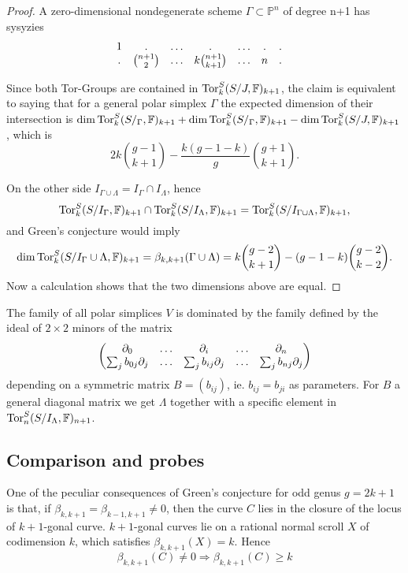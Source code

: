 \documentclass[12pt,leqno]{amsart}
\newcommand{\FF}{{\mathbb F}}
\newcommand{\PP}{{\mathbb P}}
\newcommand{\Tor}{{\rm{Tor}}}
\newlength{\ho}
\begin{document}
\begin{proof}
A zero-dimensional nondegenerate scheme $\Gamma\subset\PP^n$ of degree n+1 
has sysyzies
$$
\begin{matrix}
1 & . &\ldots& . & \ldots &.&.\cr
. &\binom{n+1}{2} &\ldots & k\binom{n+1}{k+1}
&\ldots &n&.&
\end{matrix}
$$

Since both Tor-Groups are contained in $\Tor^S_k(S/J,\FF)_{k+1}$, 
the claim is equivalent to saying that for a general polar simplex $\Gamma$ 
the expected dimension of their intersection is 
$\dim\Tor^S_k(S/_\Gamma,\FF)_{k+1}+\dim\Tor^S_k(S/_\Gamma,\FF)_{k+1}
-\dim\Tor^S_k(S/J,\FF)_{k+1}$, which is
$$
2k\binom{g-1}{k+1}-\frac{k(g-1-k)}{g}\binom{g+1}{k+1}.
$$

On the other side $I_{\Gamma\cup\Lambda}=I_\Gamma\cap I_\Lambda$, hence
$$\Tor^S_k(S/I_\Gamma,\FF)_{k+1} \cap \Tor^S_k(S/I_\Lambda,\FF)_{k+1} 
=\Tor^S_k(S/I_{\Gamma\cup\Lambda},\FF)_{k+1},$$
and Green's conjecture would imply
$$
\dim\Tor^S_k(S/I_\Gamma\cup\Lambda,\FF)_{k+1}=\beta_{k,k+1}(\Gamma\cup\Lambda)
=k\binom{g-2}{k+1}-(g-1-k)\binom{g-2}{k-2}.
$$
Now a calculation shows that the two dimensions above are equal.
\end{proof}


The family of all polar simplices $V$ is dominated by the family defined  
by the ideal of $2 \times 2$ minors of the matrix
$$\begin{pmatrix} 
\partial_0 & \ldots & \partial_i & \ldots &\partial_n \cr
\sum_j b_{0j} \partial_j & \ldots &\sum_j b_{ij} \partial_j & \ldots & \sum_j b_{nj} \partial_j
\end{pmatrix}$$
depending on     
a symmetric matrix $B=(b_{ij})$, ie. $b_{ij}=b_{ji}$ as parameters.
For $B$  a general diagonal matrix
we get $\Lambda$ together with a specific element in 
$\Tor^S_n(S/I_\Lambda,\FF)_{n+1}$. 





\subsection{Comparison and probes}

One of the peculiar consequences of Green's conjecture for odd genus $g=2k+1$ 
is that, if $\beta_{k,k+1} = \beta_{k-1,k+1} \ne 0$, then the curve $C$ lies 
in the closure of the locus of $k+1$-gonal curve. $k+1$-gonal curves 
lie on a rational normal 
scroll $X$ of codimension $k$, which satisfies 
$\beta_{k,k+1}(X) = k$. Hence
$$\beta_{k,k+1}(C) \ne 0 \Rightarrow \beta_{k,k+1}(C) \ge k$$
\end{document}
